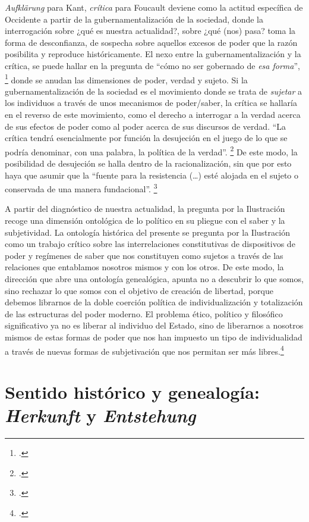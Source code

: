 \emph{Aufklärung} para Kant, \emph{crítica} para Foucault deviene como la actitud específica de Occidente a partir de la gubernamentalización de la sociedad, donde la interrogación sobre ¿qué es nuestra actualidad?, sobre ¿qué (nos) pasa? toma la forma de desconfianza, de sospecha sobre aquellos excesos de poder que la razón posibilita y reproduce históricamente. El nexo entre la gubernamentalización y la crítica, se puede hallar en la pregunta de \enquote{cómo no ser gobernado de \emph{esa forma}}, \footcite[][7]{@7042-FOUCAULT1995} donde se anudan las dimensiones de poder, verdad y sujeto. Si la gubernamentalización de la sociedad es el movimiento donde se trata de \emph{sujetar} a los individuos a través de unos mecanismos de poder/saber, la crítica se hallaría en el reverso de este movimiento, como el derecho a interrogar a la verdad acerca de sus efectos de poder como al poder acerca de sus discursos de verdad. \enquote{La crítica tendrá esencialmente por función la desujeción en el juego de lo que se podría denominar, con una palabra, la política de la verdad}. \footcite[][8]{@7042-FOUCAULT1995} De este modo, la posibilidad de desujeción se halla dentro de la racionalización, sin que por esto haya que asumir que la \enquote{fuente para la resistencia (\ldots) esté alojada en el sujeto o conservada de una manera fundacional}. \footcite[][10]{@7036-BUTLER2001}

A partir del diagnóstico de nuestra actualidad, la pregunta por la Ilustración recoge una dimensión ontológica de lo político en su pliegue con el saber y la subjetividad. La ontología histórica del presente se pregunta por la Ilustración como un trabajo crítico sobre las interrelaciones constitutivas de dispositivos de poder y regímenes de saber que nos constituyen como sujetos a través de las relaciones que entablamos nosotros mismos y con los otros. De este modo, la dirección que abre una ontología genealógica, apunta no a descubrir lo que somos, sino rechazar lo que somos con el objetivo de creación de libertad, porque debemos librarnos de la doble coerción política de individualización y totalización de las estructuras del poder moderno. El problema ético, político y filosófico significativo ya no es liberar al individuo del Estado, sino de liberarnos a nosotros mismos de estas formas de poder que nos han impuesto un tipo de individualidad a través de nuevas formas de subjetivación que nos permitan ser más libres.\footcite[][]{@7043-FOUCAULT1986}

\section{Sentido histórico y genealogía: \emph{Herkunft} y \emph{Entstehung}}


